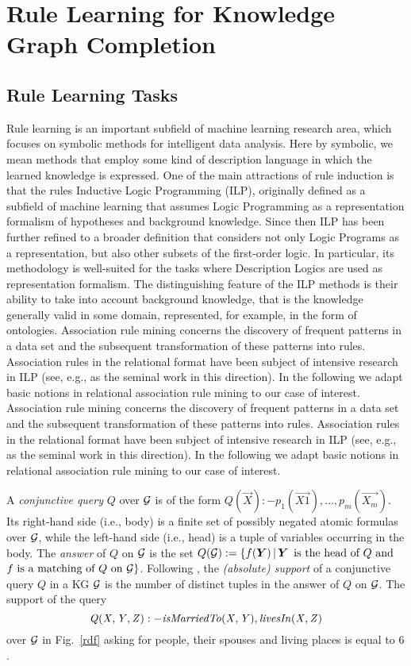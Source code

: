 \section{ Rule Learning for Knowledge Graph Completion}
\label{sec:rules_kg_completion}
\subsection{Rule Learning Tasks}
Rule learning is an important subfield of machine learning research area, which focuses on symbolic methods for intelligent data analysis. Here by symbolic, we mean methods that employ some kind of description language in which the learned knowledge is expressed. One of the main attractions of rule induction is that the rules 
Inductive Logic Programming (ILP), originally defined as a subfield
of machine learning that assumes Logic Programming as a representation formalism of
hypotheses and background knowledge. Since then ILP has been further refined to a
broader definition that considers not only Logic Programs as a representation, but also
other subsets of the first-order logic. In particular, its methodology is well-suited for the
tasks where Description Logics are used as representation formalism. The distinguishing
feature of the ILP methods is their ability to take into account background knowledge,
that is the knowledge generally valid in some domain, represented, for example, in the
form of ontologies.
Association rule mining concerns the discovery of frequent patterns in a data set and the subsequent transformation of these patterns into rules. Association rules in the relational format have been subject of intensive research in ILP (see, e.g., \cite{DBLP:conf/ilp/DehaspeR97} as the seminal work in this direction). In the following we adapt basic notions in relational association rule mining to our case of interest.
Association rule mining concerns the discovery of frequent patterns in a data set and the subsequent transformation of these patterns into rules. Association rules in the relational format have been subject of intensive research in ILP (see, e.g., \cite{DBLP:conf/ilp/DehaspeR97} as the seminal work in this direction). In the following we adapt basic notions in relational association rule mining to our case of interest.

A \emph{conjunctive query} $Q$ over $\mathcal{G}$ is of the form $Q(\vec{X}):-p_1(\vec{X1}),\dotsc,p_m(\vec{X_m})$. Its  right-hand side (i.e., body) is a finite set of possibly negated atomic formulas over $\mathcal{G}$, while the left-hand side (i.e., head) is a tuple of variables occurring in the body. The \emph{answer} of $Q$ on $\mathcal{G}$ is the set $Q(\cG):=\{f(\vec{Y})\,|\,\vec{Y}\,\text{  is the head of } Q \text{ and }$\\$ f \text{ is a matching of } Q \text{ on } \mathcal{G}\}$.
Following \cite{DBLP:conf/ilp/DehaspeR97}, the \emph{(absolute) support} of a conjunctive query $Q$ in a KG $\mathcal{G}$ is the number of distinct tuples in the answer of $Q$ on $\mathcal{G}$. The support of the query
\begin{equation}\mathit{Q(X,Y,Z):-isMarriedTo(X,Y),\, }\mathit{livesIn(X,Z)}
\end{equation}
over $\mathcal{G}$ in Fig.~\ref{rdf} asking for people, their spouses and living places is equal to $6$. 

